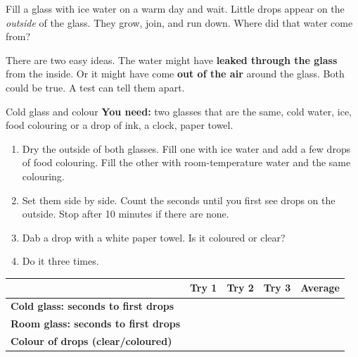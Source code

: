 \label{ch3}

Fill a glass with ice water on a warm day and wait. Little drops appear on the \emph{outside} of the glass. They grow, join, and run down. Where did that water come from?

There are two easy ideas. The water might have \textbf{leaked through the glass} from the inside. Or it might have come \textbf{out of the air} around the glass. Both could be true. A test can tell them apart.

\begin{center}
\end{center}

\begin{tryit}{Cold glass and colour}
\textbf{You need:} two glasses that are the same, cold water, ice, food colouring or a drop of ink, a clock, paper towel.
\begin{enumerate}[leftmargin=1.6em]
\item Dry the outside of both glasses. Fill one with ice water and add a few drops of food colouring. Fill the other with room-temperature water and the same colouring.
\item Set them side by side. Count the seconds until you first see drops on the outside. Stop after 10 minutes if there are none.
\item Dab a drop with a white paper towel. Is it coloured or clear?
\item Do it three times.
\end{enumerate}
\par\medskip
\renewcommand{\arraystretch}{1.6}
\begin{tabular}{|l|c|c|c|c|}
\hline
 & \textbf{Try 1} & \textbf{Try 2} & \textbf{Try 3} & \textbf{Average}\\ \hline
\textbf{Cold glass: seconds to first drops} & & & & \\ \hline
\textbf{Room glass: seconds to first drops} & & & & \\ \hline
\textbf{Colour of drops (clear/coloured)} & & & & \\ \hline
\end{tabular}
\end{tryit}

